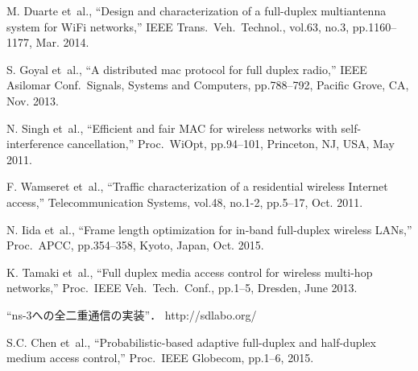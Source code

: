 \documentclass[technicalreport]{ieicej}
\begin{document}
\begin{comment}


\end{comment}

\begin{thebibliography}{1}

M. Duarte et~al.,
``Design and characterization of a full-duplex multiantenna system for {WiFi}
  networks,''
{IEEE} Trans.\ Veh.\ Technol.,
vol.63, no.3, pp.1160--1177, Mar. 2014.

S. Goyal et~al.,
``A distributed mac protocol for full duplex radio,''
IEEE Asilomar Conf.\ Signals, Systems and Computers,
pp.788--792,
Pacific Grove, CA, Nov. 2013.

N. Singh et~al.,
``Efficient and fair {MAC} for wireless networks with self-interference
  cancellation,''
Proc.\ {WiOpt},
pp.94--101,
Princeton, NJ, USA, May 2011.

F. Wamseret et~al.,
``Traffic characterization of a residential wireless {I}nternet access,''
Telecommunication Systems,
vol.48, no.1-2, pp.5--17, Oct. 2011.

N. Iida et~al.,
``Frame length optimization for in-band full-duplex wireless {LAN}s,''
Proc.\ APCC,
pp.354--358,
Kyoto, Japan, Oct. 2015.

K. Tamaki et~al.,
``Full duplex media access control for wireless multi-hop networks,''
Proc.\ IEEE Veh.\ Tech.\ Conf.,
pp.1--5,
Dresden, June 2013.

``ns-3への全二重通信の実装''． http://sdlabo.org/

S.C. Chen et~al.,
``Probabilistic-based adaptive full-duplex and half-duplex medium access
  control,''
Proc.\ {IEEE} Globecom,
pp.1--6, 2015.

\end{thebibliography}
\end{document}
